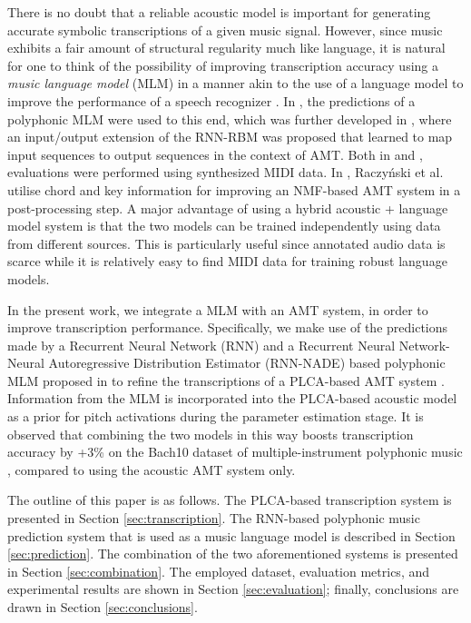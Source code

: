 There is no doubt that a reliable acoustic model is important for generating accurate symbolic transcriptions of a given music signal. However, since music exhibits a fair amount of structural regularity much like language, it is natural for one to think of the possibility of improving transcription accuracy using a \textit{music language model} (MLM) in a manner akin to the use of a language model to improve the performance of a speech recognizer \cite{Rabiner1993}. In \cite{Boulanger-Lewandowski2012}, the predictions of a polyphonic MLM were used to this end, which was further developed in \cite{Boulanger-Lewandowski2013}, where an input/output extension of the RNN-RBM was proposed that learned to map input sequences to output sequences in the context of AMT. Both in \cite{Boulanger-Lewandowski2012} and \cite{Boulanger-Lewandowski2013}, evaluations were performed using synthesized MIDI data. In \cite{Raczynski13}, Raczy\'{n}ski et al. utilise chord and key information for improving an NMF-based AMT system in a post-processing step. A major advantage of using a hybrid acoustic + language model system is that the two models can be trained independently using data from different sources. This is particularly useful since annotated audio data is scarce while it is relatively easy to find MIDI data for training robust language models. 


In the present work, we integrate a MLM with an AMT system, in order to improve transcription performance. Specifically, we make use of the predictions made by a Recurrent Neural Network (RNN) and a Recurrent Neural Network-Neural Autoregressive Distribution Estimator (RNN-NADE) based polyphonic MLM proposed in \cite{Boulanger-Lewandowski2012} to refine the transcriptions of a PLCA-based AMT system \cite{Benetos2012, Benetos2013}. Information from the MLM is incorporated into the PLCA-based acoustic model as a prior for pitch activations during the parameter estimation stage. It is observed that combining the two models in this way boosts transcription accuracy by +3\% on the Bach10 dataset of multiple-instrument polyphonic music \cite{Duan2010}, compared to using the acoustic AMT system only.

The outline of this paper is as follows. The PLCA-based transcription system is presented in Section \ref{sec:transcription}. The RNN-based polyphonic music prediction system that is used as a music language model is described in Section \ref{sec:prediction}. The combination of the two aforementioned systems is presented in Section \ref{sec:combination}. The employed dataset, evaluation metrics, and experimental results are shown in Section \ref{sec:evaluation}; finally, conclusions are drawn in Section \ref{sec:conclusions}.